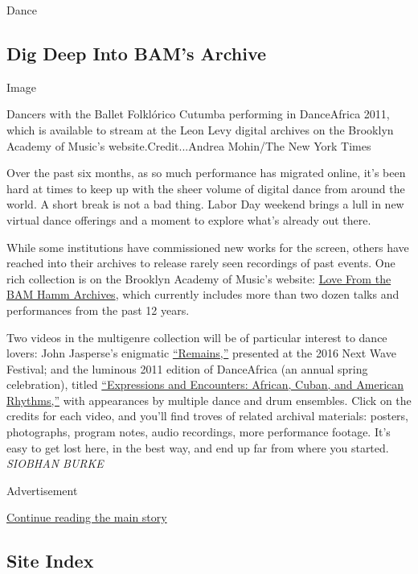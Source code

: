 Dance

\hypertarget{dig-deep-into-bams-archive}{%
\subsection{Dig Deep Into BAM's
Archive}\label{dig-deep-into-bams-archive}}

Image

Dancers with the Ballet Folklórico Cutumba performing in DanceAfrica
2011, which is available to stream at the Leon Levy digital archives on
the Brooklyn Academy of Music's website.Credit...Andrea Mohin/The New
York Times

Over the past six months, as so much performance has migrated online,
it's been hard at times to keep up with the sheer volume of digital
dance from around the world. A short break is not a bad thing. Labor Day
weekend brings a lull in new virtual dance offerings and a moment to
explore what's already out there.

While some institutions have commissioned new works for the screen,
others have reached into their archives to release rarely seen
recordings of past events. One rich collection is on the Brooklyn
Academy of Music's website:
\href{http://levyarchive.bam.org/Front/Index/featured_set_id/3304}{Love
From the BAM Hamm Archives}, which currently includes more than two
dozen talks and performances from the past 12 years.

Two videos in the multigenre collection will be of particular interest
to dance lovers: John Jasperse's enigmatic
\href{http://levyarchive.bam.org/Detail/objects/84168}{``Remains,''}
presented at the 2016 Next Wave Festival; and the luminous 2011 edition
of DanceAfrica (an annual spring celebration), titled
\href{http://levyarchive.bam.org/Detail/objects/92549}{``Expressions and
Encounters: African, Cuban, and American Rhythms,''} with appearances by
multiple dance and drum ensembles. Click on the credits for each video,
and you'll find troves of related archival materials: posters,
photographs, program notes, audio recordings, more performance footage.
It's easy to get lost here, in the best way, and end up far from where
you started.\\
\emph{SIOBHAN BURKE}

Advertisement

\protect\hyperlink{after-bottom}{Continue reading the main story}

\hypertarget{site-index}{%
\subsection{Site Index}\label{site-index}}

